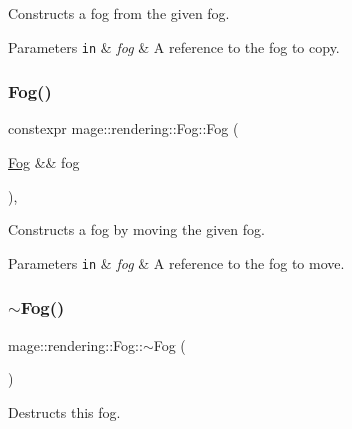 Constructs a fog from the given fog.


\begin{DoxyParams}[1]{Parameters}
\mbox{\tt in}  & {\em fog} & A reference to the fog to copy. \\
\hline
\end{DoxyParams}
\mbox{\label{classmage_1_1rendering_1_1_fog_aeed9b3fc18dabe37199c51ed7c4f5930}} 
\subsubsection{\texorpdfstring{Fog()}{Fog()}\hspace{0.1cm}{\footnotesize\ttfamily [3/3]}}
{\footnotesize\ttfamily constexpr mage\+::rendering\+::\+Fog\+::\+Fog (\begin{DoxyParamCaption}\item[{\mbox{\hyperlink{classmage_1_1rendering_1_1_fog}{Fog}} \&\&}]{fog }\end{DoxyParamCaption})\hspace{0.3cm}{\ttfamily [default]}, {\ttfamily [noexcept]}}

Constructs a fog by moving the given fog.


\begin{DoxyParams}[1]{Parameters}
\mbox{\tt in}  & {\em fog} & A reference to the fog to move. \\
\hline
\end{DoxyParams}
\mbox{\label{classmage_1_1rendering_1_1_fog_a3dfb641a2c5688172e3c4be7c91631a2}} 
\subsubsection{\texorpdfstring{$\sim$\+Fog()}{~Fog()}}
{\footnotesize\ttfamily mage\+::rendering\+::\+Fog\+::$\sim$\+Fog (\begin{DoxyParamCaption}{ }\end{DoxyParamCaption})\hspace{0.3cm}{\ttfamily [default]}}

Destructs this fog. 


